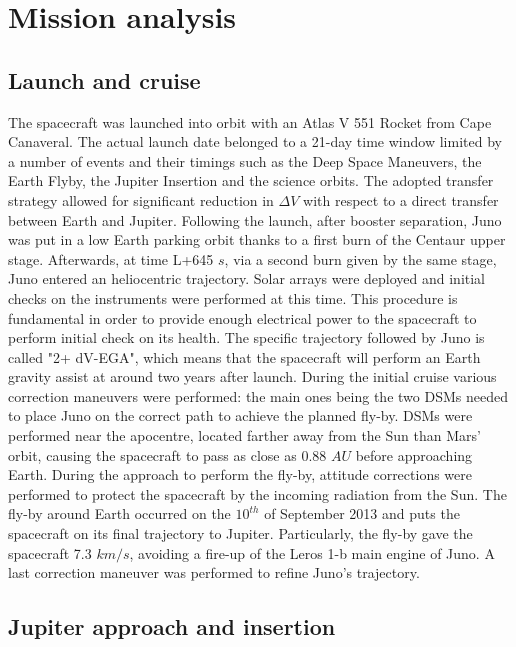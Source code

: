 \section{Mission analysis}
\label{sec:mission_analysis}

\subsection{Launch and cruise} 
\label{sec: lancio e crociera}

The spacecraft was launched into orbit with an Atlas V 551 Rocket from Cape Canaveral. The actual launch date belonged to a 21-day time window limited by a number of events and their timings such as the Deep Space Maneuvers, the Earth Flyby, the Jupiter Insertion and the science orbits. The adopted transfer strategy allowed for significant reduction in $\Delta V$ with respect to a direct transfer between Earth and Jupiter. 
Following the launch, after booster separation, Juno was put in a low Earth parking orbit thanks to a first burn of the Centaur upper stage. Afterwards, at time L+645 $s$, via a second burn given by the same stage, Juno entered an heliocentric trajectory. Solar arrays were deployed and initial checks on the instruments were performed at this time. This procedure is fundamental in order to provide enough electrical power to the spacecraft to perform initial check on its health. 
The specific trajectory followed by Juno is called "2+ dV-EGA", which means that the spacecraft will perform an Earth gravity assist at around two years after launch.
During the initial cruise various correction maneuvers were performed: the main ones being the two DSMs needed to place Juno on the correct path to achieve the planned fly-by. 
DSMs were performed near the apocentre, located farther away from the Sun than Mars' orbit, causing the spacecraft to pass as close as 0.88 $AU$ before approaching Earth.  During the approach to perform the fly-by, attitude corrections were performed to protect the spacecraft by the incoming radiation from the Sun. 
The fly-by around Earth occurred on the $10^{th}$ of September 2013 and puts the spacecraft on its final trajectory to Jupiter. Particularly, the fly-by gave the spacecraft 7.3 $km/s$, avoiding a fire-up of the Leros 1-b main engine of Juno. A last correction maneuver was performed to refine Juno's trajectory.\cite{spaceflight101} \cite{batterie} \cite{Juno_launch} \cite{Overview_Juno}

\subsection{Jupiter approach and insertion} 
\label{sec: joi}

